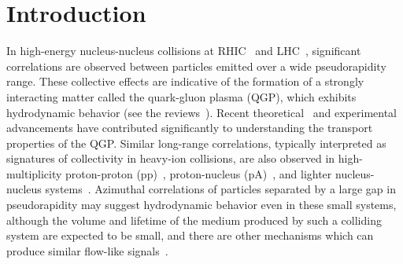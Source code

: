 
\section{Introduction}
\label{sec:intro}

In high-energy nucleus-nucleus collisions at RHIC~\cite{Adams:2005dq,Adcox:2004mh,Arsene:2004fa,Back:2004je} and LHC~\cite{Abelev:2012di, Abelev:2014pua, ATLAS:2011ah}, significant correlations are observed between particles emitted over a wide pseudorapidity range. These collective effects are indicative of the formation of a strongly interacting matter called the quark-gluon plasma (QGP), which exhibits hydrodynamic behavior (see the reviews~\cite{Romatschke:2007mq,Jeon:2015dfa,Romatschke:2017ejr}). 
Recent theoretical~\cite{Niemi:2015qia,Bernhard:2016tnd,Bernhard2019} and experimental~\cite{ALICE:2016kpq,Acharya:2017gsw,Acharya:2017zfg,Acharya:2020taj} advancements have contributed significantly to understanding the transport properties of the QGP.
Similar long-range correlations, typically interpreted as signatures of collectivity in heavy-ion collisions, are also observed in high-multiplicity proton-proton (pp)~\cite{Aad:2015gqa,Khachatryan:2015lva,Khachatryan:2016txc,Acharya:2019vdf}, proton-nucleus (pA)~\cite{Abelev:2012ola,Aad:2014lta,Aaboud:2016yar,Khachatryan:2016ibd}, and lighter nucleus-nucleus systems~\cite{PHENIX:2018lia,Aidala:2017ajz}.
Azimuthal correlations of particles separated by a large gap in pseudorapidity may suggest hydrodynamic behavior even in these small systems, although the volume and lifetime of the medium produced by such a colliding system are expected to be small, and there are other mechanisms which can produce similar flow-like signals~\cite{Busza:2018rrf,Nagle:2018nvi}.

